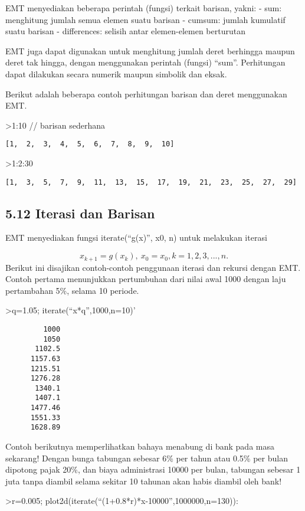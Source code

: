 \documentclass[
]{book}
\begin{document}
EMT menyediakan beberapa perintah (fungsi) terkait barisan, yakni: - sum: menghitung jumlah semua elemen suatu barisan - cumsum: jumlah kumulatif suatu barisan - differences: selisih antar elemen-elemen berturutan

EMT juga dapat digunakan untuk menghitung jumlah deret berhingga maupun deret tak hingga, dengan menggunakan perintah (fungsi) ``sum''. Perhitungan dapat dilakukan secara numerik maupun simbolik dan eksak.

Berikut adalah beberapa contoh perhitungan barisan dan deret menggunakan EMT.

\textgreater1:10 // barisan sederhana

\begin{verbatim}
[1,  2,  3,  4,  5,  6,  7,  8,  9,  10]
\end{verbatim}

\textgreater1:2:30

\begin{verbatim}
[1,  3,  5,  7,  9,  11,  13,  15,  17,  19,  21,  23,  25,  27,  29]
\end{verbatim}

\subsection{5.12 Iterasi dan Barisan}\label{iterasi-dan-barisan}

EMT menyediakan fungsi iterate(``g(x)'', x0, n) untuk melakukan iterasi

\[x_{k+1}=g(x_k), \ x_0=x_0, k= 1, 2, 3, ..., n.\]Berikut ini disajikan contoh-contoh penggunaan iterasi dan rekursi dengan EMT. Contoh pertama menunjukkan pertumbuhan dari nilai awal 1000 dengan laju pertambahan 5\%, selama 10 periode.

\textgreater q=1.05; iterate(``x*q'',1000,n=10)'

\begin{verbatim}
         1000 
         1050 
       1102.5 
      1157.63 
      1215.51 
      1276.28 
       1340.1 
       1407.1 
      1477.46 
      1551.33 
      1628.89 
\end{verbatim}

Contoh berikutnya memperlihatkan bahaya menabung di bank pada masa sekarang! Dengan bunga tabungan sebesar 6\% per tahun atau 0.5\% per bulan dipotong pajak 20\%, dan biaya administrasi 10000 per bulan, tabungan sebesar 1 juta tanpa diambil selama sekitar 10 tahunan akan habis diambil oleh bank!

\textgreater r=0.005; plot2d(iterate(``(1+0.8*r)*x-10000'',1000000,n=130)):
\end{document}
